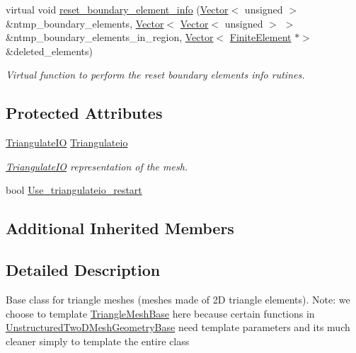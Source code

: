 \begin{DoxyCompactItemize}
virtual void \hyperlink{classoomph_1_1TriangleMeshBase_a87ca1b2f78d61547def3245a5201689e}{reset\+\_\+boundary\+\_\+element\+\_\+info} (\hyperlink{classoomph_1_1Vector}{Vector}$<$ unsigned $>$ \&ntmp\+\_\+boundary\+\_\+elements, \hyperlink{classoomph_1_1Vector}{Vector}$<$ \hyperlink{classoomph_1_1Vector}{Vector}$<$ unsigned $>$ $>$ \&ntmp\+\_\+boundary\+\_\+elements\+\_\+in\+\_\+region, \hyperlink{classoomph_1_1Vector}{Vector}$<$ \hyperlink{classoomph_1_1FiniteElement}{Finite\+Element} $\ast$$>$ \&deleted\+\_\+elements)
\begin{DoxyCompactList}\small\item\em Virtual function to perform the reset boundary elements info rutines. \end{DoxyCompactList}\end{DoxyCompactItemize}
\subsection*{Protected Attributes}
\begin{DoxyCompactItemize}
\item 
\hyperlink{structoomph_1_1TriangulateIO}{Triangulate\+IO} \hyperlink{classoomph_1_1TriangleMeshBase_a488453de96eadbe320ea97c63a34d748}{Triangulateio}
\begin{DoxyCompactList}\small\item\em \hyperlink{structoomph_1_1TriangulateIO}{Triangulate\+IO} representation of the mesh. \end{DoxyCompactList}\item 
bool \hyperlink{classoomph_1_1TriangleMeshBase_a503839a1350bee25717570fbf504a2e1}{Use\+\_\+triangulateio\+\_\+restart}
\end{DoxyCompactItemize}
\subsection*{Additional Inherited Members}


\subsection{Detailed Description}
Base class for triangle meshes (meshes made of 2D triangle elements). Note\+: we choose to template \hyperlink{classoomph_1_1TriangleMeshBase}{Triangle\+Mesh\+Base} here because certain functions in \hyperlink{classoomph_1_1UnstructuredTwoDMeshGeometryBase}{Unstructured\+Two\+D\+Mesh\+Geometry\+Base} need template parameters and it\textquotesingle{}s much cleaner simply to template the entire class 

